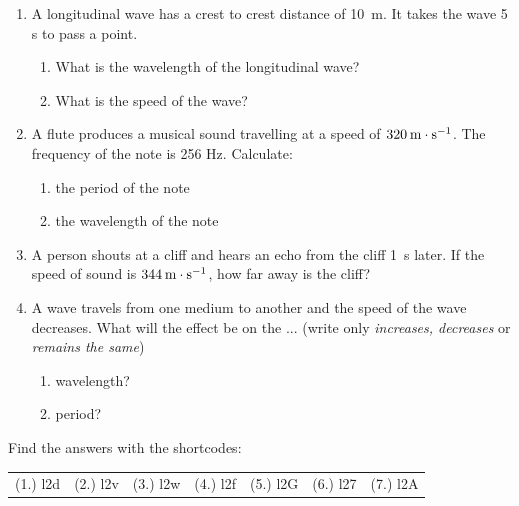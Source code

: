 \begin{enumerate}[noitemsep, label=\textbf{\arabic*}. ]
\begin{table}[H]
    \begin{caption}{\small\bfseries Table 8.1}\end{caption}
\end{table}
    \par
          \label{m38783*uid38}\item A longitudinal wave has a crest to crest distance of 10~m. It takes the wave 5 s to pass a point.
\label{m38783*id294078}\begin{enumerate}[noitemsep, label=\textbf{\alph*}. ] 
            \label{m38783*uid39}\item What is the wavelength of the longitudinal wave?
\label{m38783*uid40}\item What is the speed of the wave?
\end{enumerate}
                \label{m38783*uid41}\item A flute produces a musical sound travelling at a speed of $320\phantom{\rule{2pt}{0ex}}\mathrm{m}\ensuremath{\cdot}\mathrm{s}{}^{-1}$. The frequency of the note is 256 Hz. Calculate:
\label{m38783*id294137}\begin{enumerate}[noitemsep, label=\textbf{\alph*}. ] 
            \label{m38783*uid42}\item the period of the note
\label{m38783*uid43}\item the wavelength of the note
\end{enumerate}
                \label{m38783*uid44}\item A person shouts at a cliff and hears an echo from the cliff 1~s later. If the speed of sound is $344\phantom{\rule{2pt}{0ex}}\mathrm{m}\ensuremath{\cdot}\mathrm{s}{}^{-1}$, how far away is the cliff?\newline
\label{m38783*uid45}\item A wave travels from one medium to another and the speed of the wave decreases. What will the effect be on the ... (write only \textsl{increases, decreases} or \textsl{remains the same})
\label{m38783*id294228}\begin{enumerate}[noitemsep, label=\textbf{\alph*}. ] 
            \label{m38783*uid46}\item wavelength?
\label{m38783*uid47}\item period?
\end{enumerate}
                \end{enumerate}
  \label{m38783**end}
  \label{e91550bed2a1600e0ddb2572d580bf8e**end}
\par {} Find the answers with the shortcodes:
 \par \begin{tabular}[h]{cccccc}
 (1.) l2d  &  (2.) l2v  &  (3.) l2w  &  (4.) l2f  &  (5.) l2G  &  (6.) l27  &  (7.) l2A  & \end{tabular}
